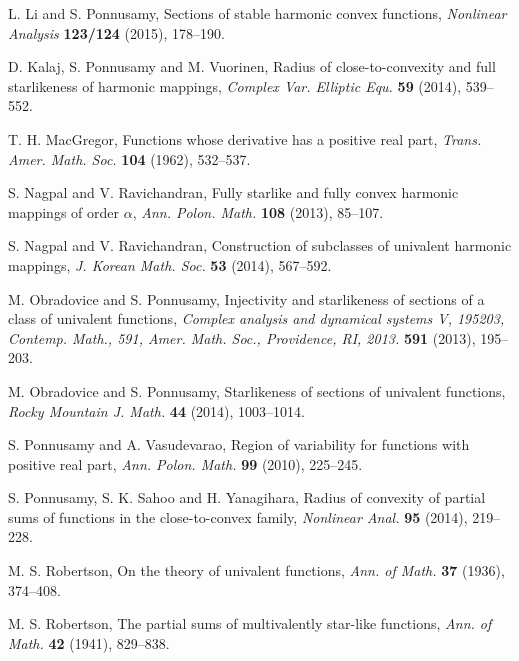 \documentclass[a4paper,12pt]{amsart}
\theoremstyle{plain}
\theoremstyle{definition}
\begin{document}
\begin{thebibliography}{99}
{\sc L. Li} and {\sc S. Ponnusamy}, Sections of stable harmonic convex functions, {\it Nonlinear Analysis} {\bf 123/124} (2015), 178--190.

{\sc D. Kalaj,  S. Ponnusamy} and {\sc M. Vuorinen}, Radius of close-to-convexity and full starlikeness of harmonic mappings, {\it Complex Var. Elliptic Equ.} {\bf 59} (2014), 539--552.

{\sc T. H. MacGregor}, Functions whose derivative has a positive real part, {\it Trans. Amer. Math. Soc.} {\bf 104} (1962), 532--537.

{\sc S. Nagpal} and {\sc V. Ravichandran}, Fully starlike and fully convex harmonic mappings of order $\alpha$, {\it Ann. Polon. Math.} {\bf 108} (2013), 85--107.

{\sc S. Nagpal} and {\sc V. Ravichandran}, Construction of subclasses of univalent harmonic mappings, {\it J. Korean Math. Soc.} {\bf 53} (2014), 567--592.

 {\sc M. Obradovice} and {\sc S. Ponnusamy}, Injectivity and starlikeness of sections of a class of univalent functions, 
 {\it Complex analysis and dynamical systems V, 195203, Contemp. Math., 591, Amer. Math. Soc., Providence, RI, 2013.} {\bf 591} (2013), 195--203.

{\sc M. Obradovice} and {\sc S. Ponnusamy}, Starlikeness of sections of univalent functions, {\it Rocky Mountain J. Math.} {\bf 44} (2014), 1003--1014.

{\sc S. Ponnusamy} and {\sc A. Vasudevarao}, Region of variability for functions with positive real part, {\it Ann. Polon. Math.} {\bf 99} (2010), 225--245.

{\sc S. Ponnusamy, S. K. Sahoo} and {\sc H. Yanagihara}, Radius of convexity of partial sums of functions in the close-to-convex family, {\it Nonlinear Anal.} {\bf 95} (2014), 219--228.

 

{\sc M. S. Robertson}, On the theory of univalent functions, {\it Ann. of Math.} {\bf 37} (1936), 374--408.

{\sc M. S. Robertson}, The partial sums of multivalently star-like functions, {\it Ann. of Math.} {\bf 42} (1941), 829--838.


\end{thebibliography}
\end{document}
